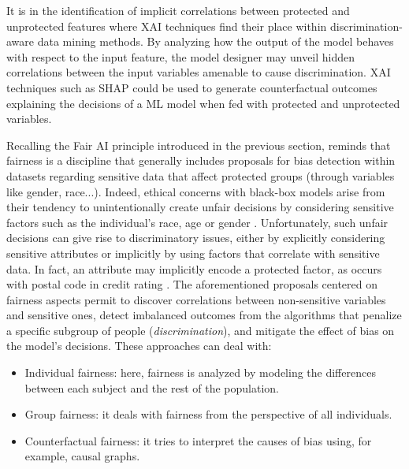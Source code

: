 \documentclass[final]{elsarticle}
\begin{document}
It is in the identification of implicit correlations between protected and unprotected features where XAI techniques find their place within discrimination-aware data mining methods. By analyzing how the output of the model behaves with respect to the input feature, the model designer may unveil hidden correlations between the input variables amenable to cause discrimination. XAI techniques such as SHAP \cite{lundberg2017unified} could be used to generate counterfactual outcomes explaining the decisions of a ML model when fed with protected and unprotected variables.

Recalling the Fair AI principle introduced in the previous section, \cite{benjamins2019responsible} reminds that fairness is a discipline that generally includes proposals for bias detection within datasets regarding sensitive data that affect protected groups (through variables like gender, race...). {\color{black}Indeed, ethical concerns with black-box models arise from their tendency to unintentionally create unfair decisions by considering sensitive factors such as the individual's race, age or gender \cite{d2017conscientious}. Unfortunately, such unfair decisions can give rise to discriminatory issues, either by explicitly considering sensitive attributes or implicitly by using factors that correlate with sensitive data. In fact, an attribute may implicitly encode a protected factor, as occurs with postal code in credit rating \cite{barocas2016big}. The aforementioned proposals centered on fairness aspects permit to discover correlations between non-sensitive variables and sensitive ones, detect imbalanced outcomes from the algorithms that penalize a specific subgroup of people {\color{black}(\emph{discrimination})}, and mitigate the effect of bias on the model's decisions. These approaches can deal with:}
\begin{itemize}[leftmargin=*]
\item Individual fairness: here, fairness is analyzed by modeling the differences between each subject and the rest of the population.

\item Group fairness: it deals with fairness from the perspective of all individuals.

\item Counterfactual fairness: it tries to interpret the causes of bias using, for example, causal graphs.
\end{itemize}
\end{document}
